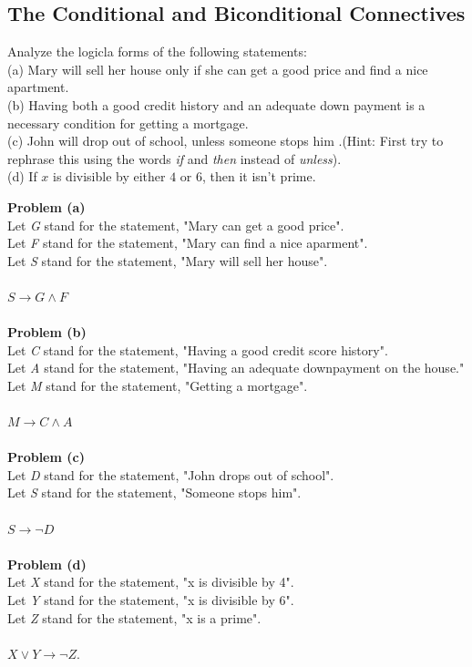 \subsection{The Conditional and Biconditional Connectives}

\begin{tcolorbox}[title=Problem 2, breakable]
Analyze the logicla forms of the following statements: \\
(a) Mary will sell her house only if she can get a good price and find a nice apartment. \\
(b) Having both a good credit history and an adequate down payment is a necessary
condition for getting a mortgage. \\
(c) John will drop out of school, unless someone stops him .(Hint: First try to
rephrase this using the words \textit{if} and \textit{then} instead of \textit{unless}). \\
(d) If $x$ is divisible by either $4$ or $6$, then it isn't prime.
\end{tcolorbox}

\textbf{Problem (a)} \\
Let \textit{G} stand for the statement, "Mary can get a good price". \\
Let \textit{F} stand for the statement, "Mary can find a nice aparment". \\
Let \textit{S} stand for the statement, "Mary will sell her house". \\ \\
$S \rightarrow G \wedge F$ \\ \\
\textbf{Problem (b)} \\
Let \textit{C} stand for the statement, "Having a good credit score history". \\
Let \textit{A} stand for the statement, "Having an adequate downpayment on the house." \\
Let \textit{M} stand for the statement, "Getting a mortgage". \\ \\
$M \rightarrow C \wedge A$ \\ \\
\textbf{Problem (c)} \\
Let \textit{D} stand for the statement, "John drops out of school". \\
Let \textit{S} stand for the statement, "Someone stops him". \\ \\
$S \rightarrow \neg D$ \\ \\
\textbf{Problem (d)} \\
Let \textit{X} stand for the statement, "x is divisible by 4". \\
Let \textit{Y} stand for the statement, "x is divisible by 6". \\
Let \textit{Z} stand for the statement, "x is a prime". \\ \\
$X \vee Y \rightarrow \neg Z$.

